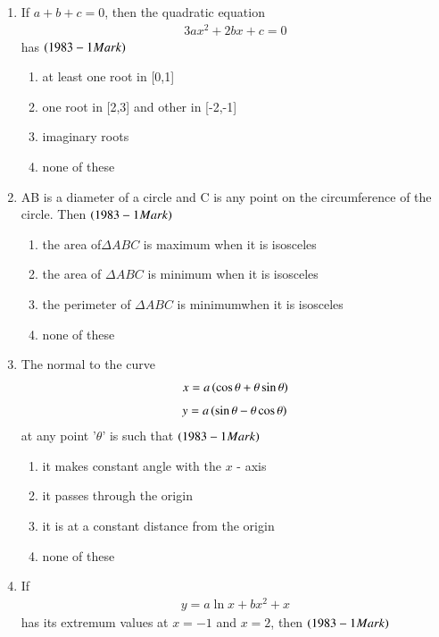 \documentclass[journal,12pt,twocolumn]{IEEEtran}
\theoremstyle{remark}
\begin{document}
\begin{enumerate}

\item If $a+b+c = 0$, then the quadratic equation 
		\begin{align*}
		3ax^2 + 2bx + c = 0
		\end{align*} has
\hfill$\left(1983 - 1 Mark\right)$
\begin{enumerate}
	\item at least one root in [0,1]
	\item one root in [2,3] and other in [-2,-1]
        \item imaginary roots
	\item none of these
\end{enumerate}

 \item AB is a diameter of a circle and C is any point on the
circumference of the circle. Then 
\hfill$\left(1983 - 1 Mark\right)$
\begin{enumerate}
	\item the area of$\Delta ABC$ is maximum when it is isosceles
	\item the area of $\Delta ABC$ is minimum when it is isosceles
	\item the perimeter of $\Delta ABC$ is minimumwhen it is isosceles
	\item none of these
\end{enumerate}

\item The normal to the curve 
\begin{align*}x = a\left(\cos \theta + \theta\sin \theta\right)
\end{align*}
\begin{align*}y = a\left(\sin \theta - \theta\cos \theta\right)
\end{align*}
at any point '$\theta$' is such that \hfill$\left(1983 - 1 Mark\right)$
\begin{enumerate}
	\item it makes  constant angle with the $x$ - axis
	\item it passes through the origin
	\item it is at a constant distance from the origin
	\item none of these\\
\end{enumerate}

\item If \begin{align*}y=a\ln x + bx^2 +x\end{align*} has its extremum values at 
$x = -1$ and $x = 2$, then
\hfill$\left(1983 - 1 Mark\right)$


\end{enumerate}
\end{document}

